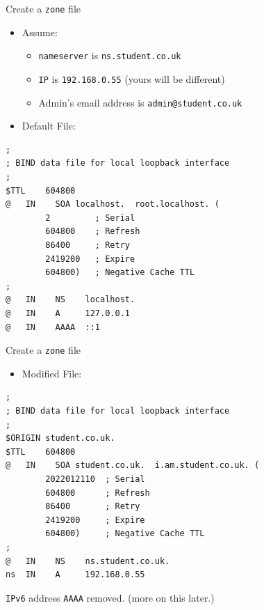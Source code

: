 \documentclass[xcolor=table]{beamer}
\begin{document}
\begin{frame}[fragile]{Create a \texttt{zone} file}
  \begin{itemize}
    \item Assume:
      \begin{itemize}
        \item \texttt{nameserver} is \texttt{ns.student.co.uk}
        \item \texttt{IP} is \texttt{192.168.0.55} (yours will be different)
        \item Admin's email address is \texttt{admin@student.co.uk}
      \end{itemize}
  \end{itemize}
  \begin{itemize}
    \item Default File:
  \end{itemize}
  \lstset{
    basicstyle=\tiny\ttfamily,
  }
  \begin{lstlisting}
;
; BIND data file for local loopback interface
;
$TTL    604800
@   IN    SOA localhost.  root.localhost. (
        2         ; Serial
        604800    ; Refresh
        86400     ; Retry
        2419200   ; Expire
        604800)   ; Negative Cache TTL
;
@   IN    NS    localhost.
@   IN    A     127.0.0.1
@   IN    AAAA  ::1
  \end{lstlisting}
\end{frame}

\begin{frame}[fragile]{Create a \texttt{zone} file}
  \begin{itemize}
    \item Modified File:
  \end{itemize}
  \lstset{
    basicstyle=\tiny\ttfamily,
  }
  \begin{lstlisting}
;
; BIND data file for local loopback interface
;
$ORIGIN student.co.uk.
$TTL    604800
@   IN    SOA student.co.uk.  i.am.student.co.uk. (
        2022012110  ; Serial
        604800      ; Refresh
        86400       ; Retry
        2419200     ; Expire
        604800)     ; Negative Cache TTL
;
@   IN    NS    ns.student.co.uk.
ns  IN    A     192.168.0.55
  \end{lstlisting}
  \begin{tcolorbox}[title={\textbf{NOTE:}}]
    \texttt{IPv6} address \texttt{AAAA} removed. (more on this later.)
  \end{tcolorbox}
\end{frame}
\end{document}
